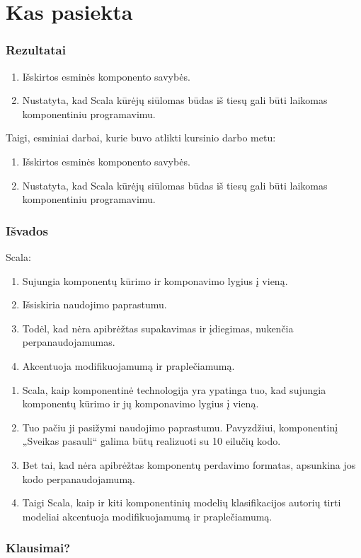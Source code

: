 \section{Kas pasiekta}

\begin{frame}
  \frametitle{Rezultatai}
  \begin{enumerate}
    \item Išskirtos esminės komponento savybės.
    \item Nustatyta, kad Scala kūrėjų siūlomas būdas iš tiesų gali
      būti laikomas komponentiniu programavimu.
  \end{enumerate}
  \begin{handout}
    Taigi, esminiai darbai, kurie buvo atlikti kursinio darbo metu:
    \begin{enumerate}
      \item Išskirtos esminės komponento savybės.
      \item Nustatyta, kad Scala kūrėjų siūlomas būdas iš tiesų gali
        būti laikomas komponentiniu programavimu.
    \end{enumerate}
  \end{handout}
\end{frame}

\begin{frame}
  \frametitle{Išvados}
  Scala:
  \begin{enumerate}
    \item Sujungia komponentų kūrimo ir komponavimo lygius į vieną.
    \item Išsiskiria naudojimo paprastumu.
    \item Todėl, kad nėra apibrėžtas supakavimas ir įdiegimas, nukenčia
      perpanaudojamumas.
    \item Akcentuoja modifikuojamumą ir praplečiamumą.
  \end{enumerate}
  \begin{handout}
    \begin{enumerate}
      \item Scala, kaip komponentinė technologija yra ypatinga tuo, kad
        sujungia komponentų kūrimo ir jų komponavimo lygius į vieną.
      \item Tuo pačiu ji pasižymi naudojimo paprastumu. Pavyzdžiui,
        komponentinį „Sveikas pasauli“ galima būtų realizuoti su
        10 eilučių kodo.
      \item Bet tai, kad nėra apibrėžtas komponentų perdavimo formatas,
        apsunkina jos kodo perpanaudojamumą.
      \item Taigi Scala, kaip ir kiti komponentinių modelių
        klasifikacijos autorių tirti modeliai akcentuoja
        modifikuojamumą ir praplečiamumą.
    \end{enumerate}
  \end{handout}
\end{frame}

\begin{frame}
  \frametitle{Klausimai?}
\end{frame}
